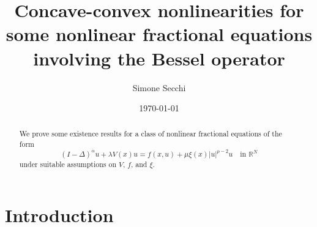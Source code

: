 \documentclass[11pt]{amsart}
\title[Concave-convex nonlinearities]{Concave-convex nonlinearities for some nonlinear fractional equations involving the Bessel operator}
\author{Simone Secchi}
\date{\today}
\numberwithin{equation}{section}
\theoremstyle{remark}
\theoremstyle{definition}
\begin{document}
\begin{abstract}
We prove some existence results for a class of nonlinear fractional equations of the form
\begin{equation*} 
\left( I-\Delta \right)^{\alpha} u + \lambda V(x) u= f(x,u)+\mu \xi(x)|u|^{p-2}u \quad \text{in $\mathbb{R}^N$}
\end{equation*}
under suitable assumptions on $V$, $f$, and $\xi$.
\end{abstract}
\maketitle










\section{Introduction}
\end{document}
